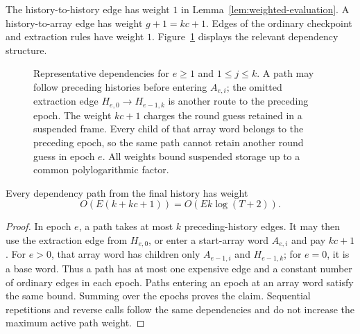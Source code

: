 The history-to-history edge has weight \(1\) in
Lemma~\ref{lem:weighted-evaluation}. A history-to-array edge has weight
\(g+1=kc+1\). Edges of the ordinary checkpoint and extraction rules
have weight \(1\). Figure~\ref{fig:epoch-path} displays the relevant
dependency structure.

\begin{figure}[htbp]
\centering

\caption{Representative dependencies for \(e\ge1\) and
\(1\le j\le k\). A path may follow preceding histories before entering
\(A_{e,i}\); the omitted extraction edge
\(H_{e,0}\to H_{e-1,k}\) is another route to the preceding epoch.
The weight \(kc+1\) charges the round guess retained in a suspended
frame. Every child of that array word belongs to the preceding epoch,
so the same path cannot retain another round guess in epoch \(e\).
All weights bound suspended storage up to a common polylogarithmic factor.}
\label{fig:epoch-path}
\end{figure}

\begin{lemma}
\label{lem:epoch-weight}
Every dependency path from the final history has weight
\[
 O(E(k+kc+1))=O(Ek\log(T+2)).
\]
\end{lemma}

\begin{proof}
In epoch \(e\), a path takes at most \(k\) preceding-history edges.
It may then use the extraction edge from \(H_{e,0}\), or enter a
start-array word \(A_{e,i}\) and pay \(kc+1\).
For \(e>0\), that array word has children only \(A_{e-1,i}\) and
\(H_{e-1,k}\); for \(e=0\), it is a base word.
Thus a path has at most one expensive edge and a constant number of
ordinary edges in each epoch. Paths entering an epoch at an array
word satisfy the same bound. Summing over the epochs proves the
claim. Sequential repetitions and reverse calls follow the same
dependencies and do not increase the maximum active path weight.
\end{proof}

